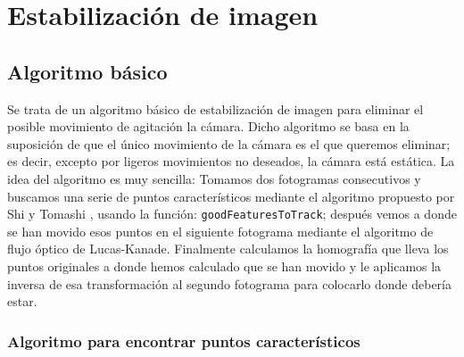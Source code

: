 \documentclass[a4paper,openright, 12pt]{book}
\begin{document}
\chapter{Estabilización de imagen}\label{cap.}

\section{Algoritmo básico}
Se trata de un algoritmo básico de estabilización de imagen para eliminar el posible movimiento de agitación la cámara. Dicho algoritmo se basa en la suposición de que el único movimiento de la cámara es el que queremos eliminar; es decir, excepto por ligeros movimientos no deseados, la cámara está estática.
La idea del algoritmo es muy sencilla: 
Tomamos dos fotogramas consecutivos y buscamos una serie de puntos característicos mediante el algoritmo propuesto por Shi y Tomashi \cite{shiandtomasi}, usando la función: \lstinline|goodFeaturesToTrack|; después vemos a donde se han movido esos puntos en el siguiente fotograma mediante el algoritmo de flujo óptico de Lucas-Kanade.
Finalmente calculamos la homografía que lleva los puntos originales a donde hemos calculado que se han movido y le aplicamos la inversa de esa transformación al segundo fotograma para colocarlo donde debería estar.
\subsection{Algoritmo para encontrar puntos característicos}
\end{document}
